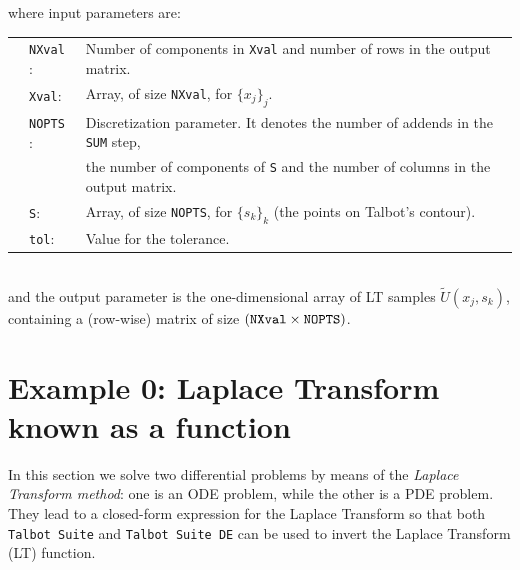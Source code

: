 \documentclass[a4paper,10pt]{report}%
\begin{document}
where input parameters are: \\
{\small\begin{tabular}{lll}
                & {\tt NXval} : & Number of components in {\tt Xval} and number of rows in the output matrix. \\
\hspace*{.25cm} & {\tt Xval}:   & Array, of size {\tt NXval}, for $\{x_j\}_j$. \\
                & {\tt NOPTS} : & Discretization parameter. It denotes the number of addends in the {\tt SUM} step, \\
                               && the number of components of {\tt S} and the number of columns in the output matrix. \\
                & {\tt S}:      & Array, of size {\tt NOPTS}, for $\{s_k\}_k$ (the points on Talbot's contour). \\
                & {\tt tol}:    & Value for the tolerance.
\end{tabular}}
\\
and the output parameter is the one-dimensional array of LT samples $\widetilde{U}(x_j,s_k)$, containing a
(row-wise) matrix of size $({\tt NXval}\times{\tt NOPTS})$.




\section{Example 0: Laplace Transform known as a function}\label{ODE:comparison}
In this section we solve two differential problems by means of the {\em Laplace Transform method}: one is an ODE
problem, while the other is a PDE problem.
They lead to a closed-form expression for the Laplace Transform so that both {\tt Talbot Suite} and
{\tt Talbot Suite DE} can be used to invert the Laplace Transform (LT) function.



\end{document}

